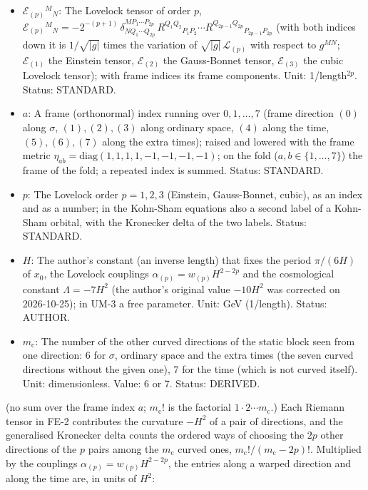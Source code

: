 \documentclass[
  10pt,
]{article}
\providecommand{\tightlist}{%
  \setlength{\itemsep}{0pt}\setlength{\parskip}{0pt}}
\begin{document}
\begin{itemize}
\tightlist
\item
  \(\mathcal{E}_{(p)}{}^M{}_N\): The Lovelock tensor of order \(p\),
  \(\mathcal{E}_{(p)}{}^M{}_N = -2^{-(p+1)}\,\delta^{MP_1\cdots P_{2p}}_{NQ_1\cdots Q_{2p}}\,R^{Q_1Q_2}{}_{P_1P_2}\cdots R^{Q_{2p-1}Q_{2p}}{}_{P_{2p-1}P_{2p}}\)
  (with both indices down it is \(1/\sqrt{\lvert g\rvert}\) times the
  variation of \(\sqrt{\lvert g\rvert}\,\mathcal{L}_{(p)}\) with respect
  to \(g^{MN}\); \(\mathcal{E}_{(1)}\) the Einstein tensor,
  \(\mathcal{E}_{(2)}\) the Gauss-Bonnet tensor, \(\mathcal{E}_{(3)}\)
  the cubic Lovelock tensor); with frame indices its frame components.
  Unit: 1/length\(^{2p}\). Status: STANDARD.
\item
  \(a\): A frame (orthonormal) index running over \(0, 1, \dots, 7\)
  (frame direction \((0)\) along \(\sigma\), \((1), (2), (3)\) along
  ordinary space, \((4)\) along the time, \((5), (6), (7)\) along the
  extra times); raised and lowered with the frame metric
  \(\eta_{ab} = \mathrm{diag}(1, 1, 1, 1, -1, -1, -1, -1)\); on the fold
  (\(a, b \in \{1, \dots, 7\}\)) the frame of the fold; a repeated index
  is summed. Status: STANDARD.
\item
  \(p\): The Lovelock order \(p = 1, 2, 3\) (Einstein, Gauss-Bonnet,
  cubic), as an index and as a number; in the Kohn-Sham equations also a
  second label of a Kohn-Sham orbital, with the Kronecker delta of the
  two labels. Status: STANDARD.
\item
  \(H\): The author's constant (an inverse length) that fixes the period
  \(\pi/(6H)\) of \(x_0\), the Lovelock couplings
  \(\alpha_{(p)} = w_{(p)}H^{2-2p}\) and the cosmological constant
  \(\Lambda = -7H^2\) (the author's original value \(-10H^2\) was
  corrected on 2026-10-25); in UM-3 a free parameter. Unit: GeV
  (1/length). Status: AUTHOR.
\item
  \(m_{\mathrm{c}}\): The number of the other curved directions of the
  static block seen from one direction: 6 for \(\sigma\), ordinary space
  and the extra times (the seven curved directions without the given
  one), 7 for the time (which is not curved itself). Unit:
  dimensionless. Value: 6 or 7. Status: DERIVED.
\end{itemize}

(no sum over the frame index \(a\); \(m_{\mathrm{c}}!\) is the factorial
\(1\cdot2\cdots m_{\mathrm{c}}\).) Each Riemann tensor in FE-2
contributes the curvature \(-H^2\) of a pair of directions, and the
generalised Kronecker delta counts the ordered ways of choosing the
\(2p\) other directions of the \(p\) pairs among the \(m_{\mathrm{c}}\)
curved ones, \(m_{\mathrm{c}}!/(m_{\mathrm{c}} - 2p)!\). Multiplied by
the couplings \(\alpha_{(p)} = w_{(p)}H^{2-2p}\), the entries along a
warped direction and along the time are, in units of \(H^2\):
\end{document}
